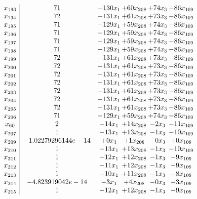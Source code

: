 \documentclass[11pt]{article}
\begin{document}
\[\begin{array}{c| c c@{\hskip 2pt} c@{\hskip 2pt} c@{\hskip 2pt} c@{\hskip 2pt} }
 x_{193}   &  71 & -130 x_{1} & + 60 x_{208} & + 74 x_{3} & -86 x_{109}\\
 x_{194}   &  72 & -131 x_{1} & + 61 x_{208} & + 73 x_{3} & -86 x_{109}\\
 x_{195}   &  71 & -129 x_{1} & + 59 x_{208} & + 74 x_{3} & -86 x_{109}\\
 x_{196}   &  71 & -129 x_{1} & + 59 x_{208} & + 74 x_{3} & -86 x_{109}\\
 x_{197}   &  71 & -129 x_{1} & + 59 x_{208} & + 74 x_{3} & -86 x_{109}\\
 x_{198}   &  71 & -129 x_{1} & + 59 x_{208} & + 74 x_{3} & -86 x_{109}\\
 x_{199}   &  72 & -131 x_{1} & + 61 x_{208} & + 73 x_{3} & -86 x_{109}\\
 x_{200}   &  72 & -131 x_{1} & + 61 x_{208} & + 73 x_{3} & -86 x_{109}\\
 x_{201}   &  72 & -131 x_{1} & + 61 x_{208} & + 73 x_{3} & -86 x_{109}\\
 x_{202}   &  72 & -131 x_{1} & + 61 x_{208} & + 73 x_{3} & -86 x_{109}\\
 x_{203}   &  72 & -131 x_{1} & + 61 x_{208} & + 73 x_{3} & -86 x_{109}\\
 x_{204}   &  72 & -131 x_{1} & + 61 x_{208} & + 73 x_{3} & -86 x_{109}\\
 x_{205}   &  72 & -131 x_{1} & + 61 x_{208} & + 73 x_{3} & -86 x_{109}\\
 x_{206}   &  71 & -129 x_{1} & + 59 x_{208} & + 74 x_{3} & -86 x_{109}\\
 x_{60}   &  2 & -14 x_{1} & + 14 x_{208} & -2 x_{3} & -11 x_{109}\\
 x_{207}   &  1 & -13 x_{1} & + 13 x_{208} & -1 x_{3} & -10 x_{109}\\
 x_{209}   &  -1.02279296144e-14 & + 0 x_{1} & + 1 x_{208} & -0 x_{3} & + 0 x_{109}\\
 x_{210}   &  1 & -13 x_{1} & + 13 x_{208} & -1 x_{3} & -10 x_{109}\\
 x_{211}   &  1 & -12 x_{1} & + 12 x_{208} & -1 x_{3} & -9 x_{109}\\
 x_{212}   &  1 & -11 x_{1} & + 12 x_{208} & -1 x_{3} & -9 x_{109}\\
 x_{213}   &  1 & -10 x_{1} & + 11 x_{208} & -1 x_{3} & -8 x_{109}\\
 x_{214}   &  -4.823919042e-14 & -3 x_{1} & + 4 x_{208} & -0 x_{3} & -3 x_{109}\\
 x_{215}   &  1 & -12 x_{1} & + 12 x_{208} & -1 x_{3} & -9 x_{109}\\

\end{array}\]
\end{document}
